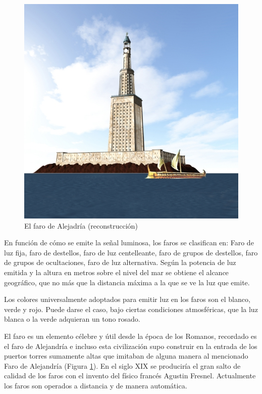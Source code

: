 \begin{figure}
  \centering
  \includegraphics[width=\linewidth]{Imagenes/06.02.vor.imagenes/faro-alejandria.jpg}
  \caption{El faro de Alejadr\'ia {\small (reconstrucci\'on)} \\}
  \label{fig:faro.alejandria}
\end{figure}

En función de cómo se emite la señal luminosa, los faros se clasifican en: Faro de luz fija, faro de destellos, faro de luz centelleante, faro de grupos de destellos, faro de grupos de ocultaciones, faro de luz alternativa. Según la potencia de luz emitida y la altura en metros sobre el nivel del mar se obtiene el alcance geográfico, que no más que la distancia máxima a la que se ve la luz que emite.

Los colores universalmente adoptados para emitir luz en los faros son el blanco, verde y rojo. Puede darse el caso, bajo ciertas condiciones atmosféricas, que la luz blanca o la verde adquieran un tono rosado.


El faro es un elemento célebre y útil desde la época de los Romanos, recordado es el faro de Alejandría e incluso esta civilización  supo construir en la entrada de los puertos torres sumamente altas que imitaban de alguna manera al mencionado Faro de Alejandr\'ia (Figura \ref{fig:faro.alejandria}). En el siglo XIX se produciría el gran salto de calidad de los faros con el invento del físico francés Agustin Fresnel. Actualmente los faros son operados a distancia y de manera automática.


